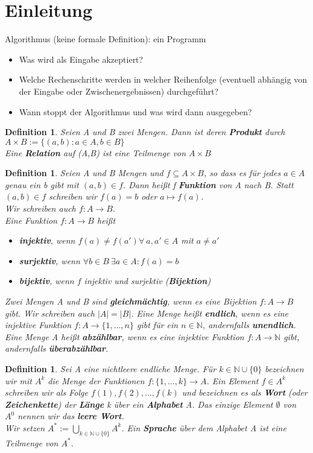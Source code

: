 \documentclass[12pt,a4paper]{article}
\theoremstyle{plain}
\newtheorem{Definition}[Theorem]{Definition}
\newcommand{\herv}[1]{{\emph{\textbf{#1}}}}
\newcommand{\N}{\mathbb{N}}
\numberwithin{equation}{section}
\begin{document}
\section{Einleitung}
Algorithmus (keine formale Definition): \glqq ein Programm \grqq \begin{itemize}
\item Was wird als Eingabe akzeptiert?
\item Welche Rechenschritte werden in welcher Reihenfolge (eventuell abhängig von der Eingabe oder Zwischenergebnissen) durchgeführt?
\item Wann stoppt der Algorithmus und was wird dann ausgegeben?
\end{itemize}
\begin{Definition}
Seien A und B zwei Mengen. Dann ist deren \herv{Produkt} durch \\
$A\times B := \{(a,b): a \in A, b\in B \}$ \\
Eine \herv{Relation} auf (A,B) ist eine Teilmenge von $A\times B $
\end{Definition}
\begin{Definition}
Seien A und B Mengen und $f\subseteq A\times B$, so dass es für jedes $a \in A$ genau ein b gibt mit $(a,b)\in f$. Dann heißt f \herv{Funktion} von A nach B. Statt $(a,b) \in f$ schreiben wir $f(a)=b$ oder $a \mapsto f(a)$. \\
Wir schreiben auch $f: A \rightarrow B$.\\
Eine Funktion $f: A\rightarrow B$ heißt 
\begin{itemize}
\item \herv{injektiv}, wenn $f(a)\neq f(a') \forall\ a,a'\in A$ mit $a\neq a'$
\item \herv{surjektiv}, wenn $\forall b\in B\  \exists a \in A: f(a)=b$
\item \herv{bijektiv}, wenn $f$ injektiv und surjektiv (\herv{Bijektion})
\end{itemize}
Zwei Mengen A und B sind \herv{gleichmächtig}, wenn es eine Bijektion $f: A\rightarrow B$ gibt. Wir schreiben auch $|A|=|B|$. Eine Menge heißt \herv{endlich}, wenn es eine injektive Funktion $f:A \rightarrow \{1,\ldots,n\}$ gibt für ein $n \in \mathbb{N}$, andernfalls \herv{unendlich}. Eine Menge A heißt \herv{abzählbar}, wenn es eine injektive Funktion $f:A\rightarrow \N$ gibt, andernfalls \herv{überabzählbar}.
\end{Definition}
\begin{Definition}
Sei A eine nichtleere endliche Menge. Für $k\in \mathbb{N}\cup\{0\}$ bezeichnen wir mit $A^k$ die Menge der Funktionen $f:\{1,\ldots,k\}\rightarrow A$. Ein Element $f\in A^k$ schreiben wir als Folge $f(1),f(2),\ldots,f(k)$ und bezeichnen es als \herv{Wort} (oder \herv{Zeichenkette}) der \herv{Länge} k über ein \herv{Alphabet} A. Das einzige Element $\emptyset$ von $A^0$ nennen wir das \herv{leere Wort}. \\
Wir setzen $A^*:=\bigcup_{k\in \mathbb{N}\cup\{0\}} A^k$. Ein \herv{Sprache} über dem Alphabet A ist eine Teilmenge von $A^*$.
\end{Definition}
\end{document}
